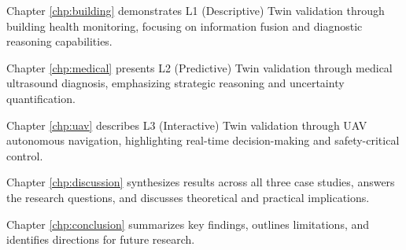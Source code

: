 Chapter \ref{chp:building} demonstrates L1 (Descriptive) Twin validation through building health monitoring, focusing on information fusion and diagnostic reasoning capabilities.

Chapter \ref{chp:medical} presents L2 (Predictive) Twin validation through medical ultrasound diagnosis, emphasizing strategic reasoning and uncertainty quantification.

Chapter \ref{chp:uav} describes L3 (Interactive) Twin validation through UAV autonomous navigation, highlighting real-time decision-making and safety-critical control.

Chapter \ref{chp:discussion} synthesizes results across all three case studies, answers the research questions, and discusses theoretical and practical implications.

Chapter \ref{chp:conclusion} summarizes key findings, outlines limitations, and identifies directions for future research.
